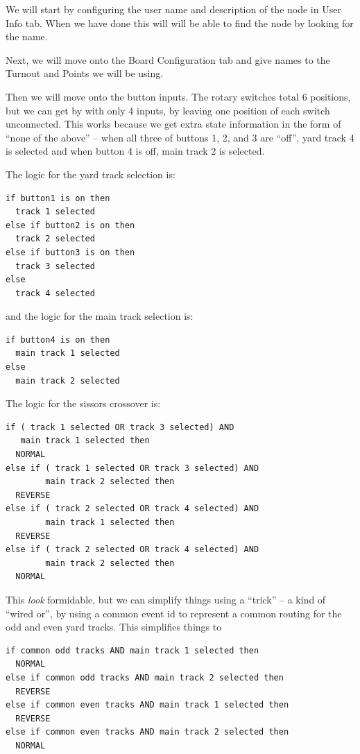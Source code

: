 We will start by configuring the user name and description of the node in User 
Info tab.  When we have done this will will be able to find the node by 
looking for the name.  

Next, we will move onto the Board Configuration tab and give names to the 
Turnout and Points we will be using.

Then we will move onto the button inputs.  The rotary switches total 6 
positions, but we can get by with only 4 inputs, by leaving one position of 
each switch unconnected.  This works because we get extra state information in 
the form of ``none of the above'' -- when all three of buttons 1, 2, and 3 are 
``off'', yard track 4 is selected and when button 4 is off, main track 2 is 
selected.

The logic for the yard track selection is:

\begin{verbatim}
if button1 is on then
  track 1 selected
else if button2 is on then
  track 2 selected
else if button3 is on then
  track 3 selected
else
  track 4 selected
\end{verbatim}

and the logic for the main track selection is:

\begin{verbatim}
if button4 is on then
  main track 1 selected
else
  main track 2 selected
\end{verbatim}

The logic for the sissors crossover is:

\begin{verbatim}
if ( track 1 selected OR track 3 selected) AND 
   main track 1 selected then
  NORMAL
else if ( track 1 selected OR track 3 selected) AND 
        main track 2 selected then
  REVERSE
else if ( track 2 selected OR track 4 selected) AND 
        main track 1 selected then
  REVERSE
else if ( track 2 selected OR track 4 selected) AND 
        main track 2 selected then
  NORMAL
\end{verbatim}

This \textit{look} formidable, but we can simplify things using a ``trick'' --
a kind of ``wired or'', by using a common event id to represent a common 
routing for the odd and even yard tracks.  This simplifies things to

\begin{verbatim}
if common odd tracks AND main track 1 selected then
  NORMAL
else if common odd tracks AND main track 2 selected then
  REVERSE
else if common even tracks AND main track 1 selected then
  REVERSE
else if common even tracks AND main track 2 selected then
  NORMAL
\end{verbatim}


